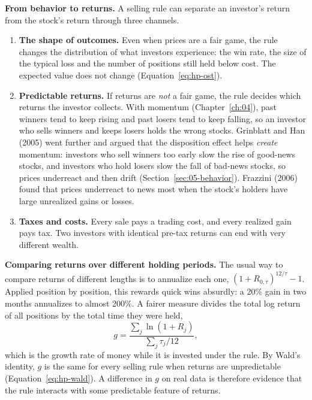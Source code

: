 \textbf{From behavior to returns.} A selling rule can separate an investor's return from the stock's return through three channels.

\begin{enumerate}
  \item \textbf{The shape of outcomes.} Even when prices are a fair game, the rule changes the distribution of what investors experience: the win rate, the size of the typical loss and the number of positions still held below cost. The expected value does not change (Equation~\eqref{eq:hp-ost}).
  \item \textbf{Predictable returns.} If returns are \emph{not} a fair game, the rule decides which returns the investor collects. With momentum (Chapter~\ref{ch:04}), past winners tend to keep rising and past losers tend to keep falling, so an investor who sells winners and keeps losers holds the wrong stocks. Grinblatt and Han (2005) went further and argued that the disposition effect helps \emph{create} momentum: investors who sell winners too early slow the rise of good-news stocks, and investors who hold losers slow the fall of bad-news stocks, so prices underreact and then drift (Section~\ref{sec:05-behavior}). Frazzini (2006) found that prices underreact to news most when the stock's holders have large unrealized gains or losses.
  \item \textbf{Taxes and costs.} Every sale pays a trading cost, and every realized gain pays tax. Two investors with identical pre-tax returns can end with very different wealth.
\end{enumerate}

\textbf{Comparing returns over different holding periods.} The usual way to compare returns of different lengths is to annualize each one, $(1 + R_{0,\tau})^{12/\tau} - 1$. Applied position by position, this rewards quick wins absurdly: a 20\% gain in two months annualizes to almost 200\%. A fairer measure divides the total log return of all positions by the total time they were held,
\begin{equation}
  g = \frac{\sum_j \ln(1 + R_j)}{\sum_j \tau_j / 12} ,
  \label{eq:hp-peryear}
\end{equation}
which is the growth rate of money while it is invested under the rule. By Wald's identity, $g$ is the same for every selling rule when returns are unpredictable (Equation~\eqref{eq:hp-wald}). A difference in $g$ on real data is therefore evidence that the rule interacts with some predictable feature of returns.

